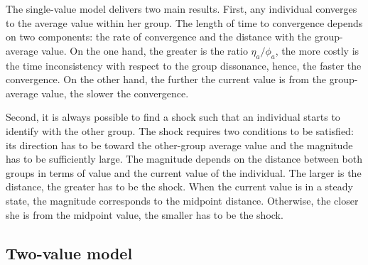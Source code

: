 The single-value model delivers two main results. First, any individual converges to the average value within her group. The length of time to convergence depends on two components: the rate of convergence and the distance with the group-average value. 
On the one hand, the greater is the ratio $\eta_a/\phi_a$, the more costly is the time inconsistency with respect to the group dissonance, hence, the faster the convergence. 
On the other hand, the further the current value is from the group-average value, the slower the convergence.

Second, it is always possible to find a shock such that an individual starts to identify with the other group. The shock requires two conditions to be satisfied: its direction has to be toward the other-group average value and the magnitude has to be sufficiently large. The magnitude depends on the distance between both groups in terms of value and the current value of the individual. The larger is the distance, the greater has to be the shock. When the current value is in a steady state, the magnitude corresponds to the midpoint distance. Otherwise, the closer she is from the midpoint value, the smaller has to be the shock.

\subsection{Two-value model}

